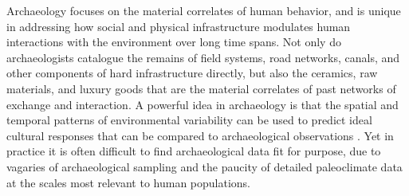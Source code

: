 \documentclass[10pt]{iopart}
\begin{document}
Archaeology focuses on the material correlates of human behavior, and is unique in addressing how social and physical infrastructure modulates human interactions with the environment over long time spans. Not only do archaeologists catalogue the remains of field systems, road networks, canals, and other components of hard infrastructure directly, but also the ceramics, raw materials, and luxury goods that are the material correlates of past networks of exchange and interaction. A powerful idea in archaeology is that the spatial and temporal patterns of environmental variability can be used to predict ideal cultural responses that can be compared to archaeological observations \parencite{Halstead1989}. Yet in practice it is often difficult to find archaeological data fit for purpose, due to vagaries of archaeological sampling and the paucity of detailed paleoclimate data at the scales most relevant to human populations. 
\end{document}
